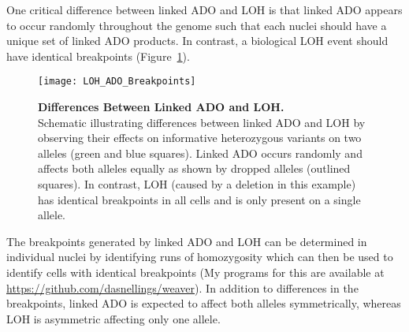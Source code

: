 One critical difference between linked ADO and LOH is that linked ADO appears to occur randomly throughout the genome such that each nuclei should have a unique set of linked ADO products. In contrast, a biological LOH event should have identical breakpoints (Figure~\ref{LOH_ADO_Breakpoints}). 
\begin{figure}[tbp!]
\begin{center}
\texttt{[image: LOH\_ADO\_Breakpoints]}
\end{center}
\caption[Differences Between Linked ADO and LOH]{\textbf{Differences Between Linked ADO and LOH.} \\ Schematic illustrating differences between linked ADO and LOH by observing their effects on informative heterozygous variants on two alleles (green and blue squares). Linked ADO occurs randomly and affects both alleles equally as shown by dropped alleles (outlined squares). In contrast, LOH (caused by a deletion in this example) has identical breakpoints in all cells and is only present on a single allele. }
\label{LOH_ADO_Breakpoints}
\end{figure}
The breakpoints generated by linked ADO and LOH can be determined in individual nuclei by identifying runs of homozygosity which can then be used to identify cells with identical breakpoints (My programs for this are available at \url{https://github.com/dasnellings/weaver}). In addition to differences in the breakpoints, linked ADO is expected to affect both alleles symmetrically, whereas LOH is asymmetric affecting only one allele.

